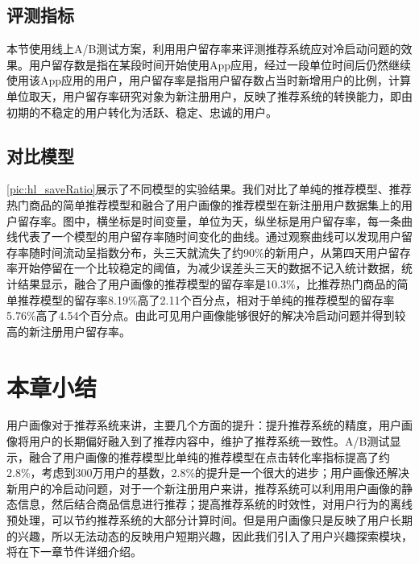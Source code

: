     \subsection{评测指标}
    本节使用线上A/B测试方案\citep{ab-test}，利用用户留存率来评测推荐系统应对冷启动问题的效果。用户留存数是指在某段时间开始使用App应用，经过一段单位时间后仍然继续使用该App应用的用户，用户留存率是指用户留存数占当时新增用户的比例，计算单位取天，用户留存率研究对象为新注册用户，反映了推荐系统的转换能力，即由初期的不稳定的用户转化为活跃、稳定、忠诚的用户。
    \subsection{对比模型}
    \autoref{pic:hl_saveRatio}展示了不同模型的实验结果。我们对比了单纯的推荐模型、推荐热门商品的简单推荐模型和融合了用户画像的推荐模型在新注册用户数据集上的用户留存率。图中，横坐标是时间变量，单位为天，纵坐标是用户留存率，每一条曲线代表了一个模型的用户留存率随时间变化的曲线。通过观察曲线可以发现用户留存率随时间流动呈指数分布，头三天就流失了约90\%的新用户，从第四天用户留存率开始停留在一个比较稳定的阈值，为减少误差头三天的数据不记入统计数据，统计结果显示，融合了用户画像的推荐模型的留存率是10.3\%，比推荐热门商品的简单推荐模型的留存率8.19\%高了2.11个百分点，相对于单纯的推荐模型的留存率5.76\%高了4.54个百分点。由此可见用户画像能够很好的解决冷启动问题并得到较高的新注册用户留存率。
    \begin{figure}
    \centering
      \label{pic:hl_saveRatio}
    \end{figure}

  \section{本章小结}
    用户画像对于推荐系统来讲，主要几个方面的提升：提升推荐系统的精度，用户画像将用户的长期偏好融入到了推荐内容中，维护了推荐系统一致性。A/B测试显示，融合了用户画像的推荐模型比单纯的推荐模型在点击转化率指标提高了约2.8\%，考虑到300万用户的基数，2.8\%的提升是一个很大的进步；用户画像还解决新用户的冷启动问题，对于一个新注册用户来讲，推荐系统可以利用用户画像的静态信息，然后结合商品信息进行推荐；提高推荐系统的时效性，对用户行为的离线预处理，可以节约推荐系统的大部分计算时间。但是用户画像只是反映了用户长期的兴趣，所以无法动态的反映用户短期兴趣，因此我们引入了用户兴趣探索模块，将在下一章节件详细介绍。
